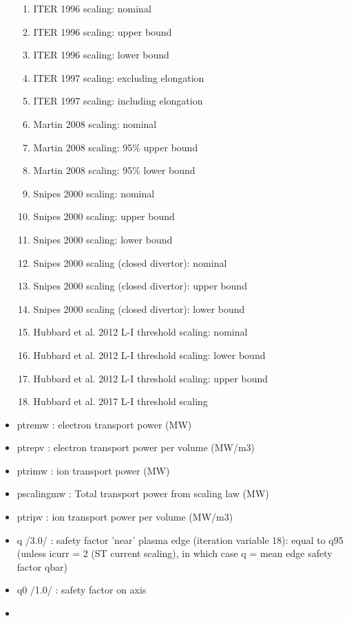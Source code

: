 \documentclass[
]{article}
\providecommand{\tightlist}{%
  \setlength{\itemsep}{0pt}\setlength{\parskip}{0pt}}
\begin{document}
\begin{itemize}
  \begin{enumerate}
  \tightlist
  \item
    ITER 1996 scaling: nominal
  \item
    ITER 1996 scaling: upper bound
  \item
    ITER 1996 scaling: lower bound
  \item
    ITER 1997 scaling: excluding elongation
  \item
    ITER 1997 scaling: including elongation
  \item
    Martin 2008 scaling: nominal
  \item
    Martin 2008 scaling: 95\% upper bound
  \item
    Martin 2008 scaling: 95\% lower bound
  \item
    Snipes 2000 scaling: nominal
  \item
    Snipes 2000 scaling: upper bound
  \item
    Snipes 2000 scaling: lower bound
  \item
    Snipes 2000 scaling (closed divertor): nominal
  \item
    Snipes 2000 scaling (closed divertor): upper bound
  \item
    Snipes 2000 scaling (closed divertor): lower bound
  \item
    Hubbard et al. 2012 L-I threshold scaling: nominal
  \item
    Hubbard et al. 2012 L-I threshold scaling: lower bound
  \item
    Hubbard et al. 2012 L-I threshold scaling: upper bound
  \item
    Hubbard et al. 2017 L-I threshold scaling
  \end{enumerate}
\item
  ptremw : electron transport power (MW)
\item
  ptrepv : electron transport power per volume (MW/m3)
\item
  ptrimw : ion transport power (MW)
\item
  pscalingmw : Total transport power from scaling law (MW)
\item
  ptripv : ion transport power per volume (MW/m3)
\item
  q /3.0/ : safety factor 'near' plasma edge (iteration variable 18):
  equal to q95 (unless icurr = 2 (ST current scaling), in which case q =
  mean edge safety factor qbar)
\item
  q0 /1.0/ : safety factor on axis
\item

\end{itemize}
\end{document}
